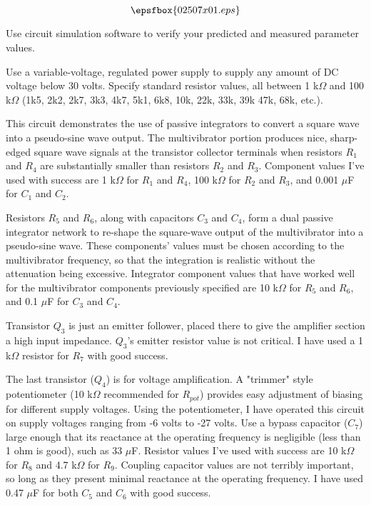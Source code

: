 

$$\epsfbox{02507x01.eps}$$

\vfil \eject






Use circuit simulation software to verify your predicted and measured parameter values.







Use a variable-voltage, regulated power supply to supply any amount of DC voltage below 30 volts.  Specify standard resistor values, all between 1 k$\Omega$ and 100 k$\Omega$ (1k5, 2k2, 2k7, 3k3, 4k7, 5k1, 6k8, 10k, 22k, 33k, 39k 47k, 68k, etc.). 

This circuit demonstrates the use of passive integrators to convert a square wave into a pseudo-sine wave output.  The multivibrator portion produces nice, sharp-edged square wave signals at the transistor collector terminals when resistors $R_1$ and $R_4$ are substantially smaller than resistors $R_2$ and $R_3$.  Component values I've used with success are 1 k$\Omega$ for $R_1$ and $R_4$, 100 k$\Omega$ for $R_2$ and $R_3$, and 0.001 $\mu$F for $C_1$ and $C_2$.

Resistors $R_5$ and $R_6$, along with capacitors $C_3$ and $C_4$, form a dual passive integrator network to re-shape the square-wave output of the multivibrator into a pseudo-sine wave.  These components' values must be chosen according to the multivibrator frequency, so that the integration is realistic without the attenuation being excessive.  Integrator component values that have worked well for the multivibrator components previously specified are 10 k$\Omega$ for $R_5$ and $R_6$, and 0.1 $\mu$F for $C_3$ and $C_4$.

Transistor $Q_3$ is just an emitter follower, placed there to give the amplifier section a high input impedance.  $Q_3$'s emitter resistor value is not critical.  I have used a 1 k$\Omega$ resistor for $R_7$ with good success.

The last transistor ($Q_4$) is for voltage amplification.  A "trimmer" style potentiometer (10 k$\Omega$ recommended for $R_{pot}$) provides easy adjustment of biasing for different supply voltages.  Using the potentiometer, I have operated this circuit on supply voltages ranging from -6 volts to -27 volts.  Use a bypass capacitor ($C_7$) large enough that its reactance at the operating frequency is negligible (less than 1 ohm is good), such as 33 $\mu$F.  Resistor values I've used with success are 10 k$\Omega$ for $R_8$ and 4.7 k$\Omega$ for $R_9$.  Coupling capacitor values are not terribly important, so long as they present minimal reactance at the operating frequency.  I have used 0.47 $\mu$F for both $C_5$ and $C_6$ with good success.


